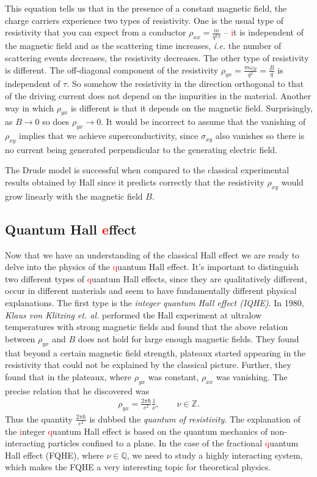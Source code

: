          This equation tells us that in the presence of a constant magnetic field, the charge carriers experience two types of resistivity. One is the usual type of resistivity that you can expect from a conductor $\rho_{xx} = \frac{m}{q^2\tau}$ -- \textcolor{red}{i}t is independent of the magnetic field and as the scattering time increases, \textit{i.e.} the number of scattering events decreases, the resistivity decreases. The other type of resistivity is different. The off-diagonal component of the resistivity $\rho_{yx} = \frac{m \omega_B}{q^2}= \frac{B}{q}$ is independent of $\tau$. So somehow the resistivity in the direction orthogonal to that of the driving current does not depend on the impurities in the material. Another way in which $\rho_{yx}$ is different is that it depends on the magnetic field. Surprisingly, as $B\rightarrow 0$ so does $\rho_{yx} \rightarrow 0$. It would be incorrect to assume that the vanishing of $\rho_{xy}$ implies that we achieve superconductivity, since $\sigma_{xy}$ also vanishes so there is no current being generated perpendicular to the generating electric field.

        The Drude model is successful when compared to the classical experimental results obtained by Hall since it predicts correctly that the resistivity  $\rho_{xy}$ would grow linearly with the magnetic field $B$.
        \subsection{Quantum Hall \textcolor{red}{e}ffect}
        Now that we have an understanding of the classical Hall effect we are ready to delve into the physics of the \textcolor{red}{q}uantum Hall effect. It's important to distinguish two different types of \textcolor{red}{q}uantum Hall effects, since they are qualitatively different, occur in different materials and seem to have fundamentally different physical explanations.
        The first type is the \textit{integer quantum Hall effect (IQHE)}. In 1980, \textit{Klaus von Klitzing et. al.} \cite{vonKlitzing:1980pdk} performed the Hall experiment at ultralow temperatures with strong magnetic fields and found that the above relation between $\rho_{yx}$ and $B$ does not hold for large enough magnetic fields. They found that beyond a certain magnetic field strength, plateaux started appearing in the resistivity that could not be explained by the classical picture. Further, they found that in the plateaux, where $\rho_{yx}$ was constant, $\rho_{xx}$ was vanishing. The precise relation that he discovered was
        \begin{align}
            \rho_{yx} = \frac{2 \pi \hbar}{e^2} \frac{1}{\nu}, \qquad \nu \in \mathbb{Z}.
        \end{align}
        Thus the quantity $\frac{2 \pi \hbar}{e^2}$ is dubbed the \textit{quantum of resistivity}. The explanation of the \textcolor{red}{i}nteger \textcolor{red}{q}uantum Hall effect is based on the quantum mechanics of non-interacting particles confined to a plane. In the case of the fractional \textcolor{red}{q}uantum Hall effect (FQHE), where $\nu \in \mathbb{Q}$, we need to study a highly interacting system, which makes the FQHE a very interesting topic for theoretical physics.

